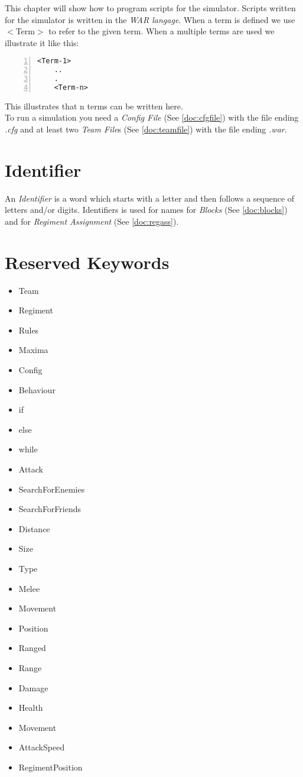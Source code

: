 This chapter will show how to program scripts for the simulator. Scripts written for the simulator is written in the {\it WAR langage}. 
When a term is defined we use $<$Term$>$ to refer to the given term. 
When a multiple terms are used we illustrate it like this: \\

		\begin{lstlisting}[basicstyle=\small\sffamily,
		keywordstyle={\color{blue}},
		comment={[l]{//}}, morecomment={[s]{/*}{*/}}, commentstyle=\itshape,
		columns={[l]flexible}, numbers=left, numberstyle=\tiny,
		frameround=fftt, frame=shadowbox, captionpos=b,
		caption={Regiment Assignment},
		label=RegimentAssignment]
	<Term-1>
	..
	.
	<Term-n>
\end{lstlisting}
This illustrates that n terms can be written here. \\

To run a simulation you need a {\it Config File} (See \ref{doc:cfgfile}) with the file ending {\it .cfg} and at least two {\it Team File}s 
(See \ref{doc:teamfile}) with the file ending {\it .war}.

\section{Identifier}
	An {\it Identifier} is a word which starts with a letter and then follows a sequence of letters and/or digits.
	Identifiers is used for names for {\it Blocks} (See \ref{doc:blocks}) and for {\it Regiment Assignment} (See \ref{doc:regass}).
\section{Reserved Keywords}
	\begin{itemize}
		\item Team
		\item Regiment
		\item Rules
		\item Maxima
		\item Config
		\item Behaviour
		\item if
		\item else
		\item while
		\item Attack
		\item SearchForEnemies
		\item SearchForFriends
		\item Distance
		\item Size
		\item Type 
		\item Melee
		\item Movement
		\item Position
		\item Ranged
		\item Range
		\item Damage
		\item Health
		\item Movement
		\item AttackSpeed
		\item RegimentPosition
	\end{itemize}
